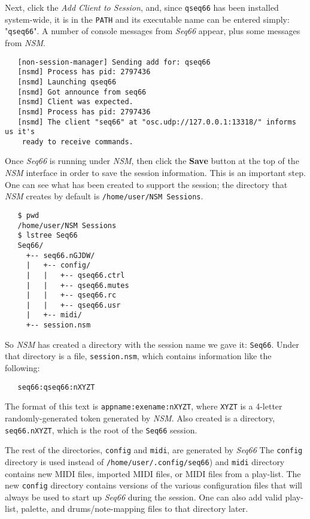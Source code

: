    Next, click the \textsl{Add Client to Session}, and, since
   \texttt{qseq66} has been installed system-wide, it is in the \texttt{PATH}
   and its executable name can be entered simply: "\texttt{qseq66}".
   A number of console messages from
   \textsl{Seq66} appear, plus some messages from \textsl{NSM}.

\begin{verbatim}
   [non-session-manager] Sending add for: qseq66
   [nsmd] Process has pid: 2797436
   [nsmd] Launching qseq66
   [nsmd] Got announce from seq66
   [nsmd] Client was expected.
   [nsmd] Process has pid: 2797436
   [nsmd] The client "seq66" at "osc.udp://127.0.0.1:13318/" informs us it's
    ready to receive commands.
\end{verbatim}

   Once \textsl{Seq66} is running under \textsl{NSM},
   then click the \textbf{Save}
   button at the top of the \textsl{NSM} interface in order
   to save the session information.  This is an important step.
   One can see what has been created to support the session;
   the directory that \textsl{NSM}
   creates by default is \texttt{/home/user/NSM Sessions}.

\begin{verbatim}
   $ pwd
   /home/user/NSM Sessions
   $ lstree Seq66
   Seq66/
     +-- seq66.nGJDW/
     |   +-- config/
     |   |   +-- qseq66.ctrl
     |   |   +-- qseq66.mutes
     |   |   +-- qseq66.rc
     |   |   +-- qseq66.usr
     |   +-- midi/
     +-- session.nsm
\end{verbatim}

   So \textsl{NSM} has created a directory with the session name we gave it:
   \texttt{Seq66}.  Under that directory is a file, \texttt{session.nsm}, which
   contains information like the following:

\begin{verbatim}
   seq66:qseq66:nXYZT
\end{verbatim}

   The format of this text is \texttt{appname:exename:nXYZT}, where
   \texttt{XYZT} is a 4-letter randomly-generated token
   generated by \textsl{NSM}.
   Also created is a directory, \texttt{seq66.nXYZT}, which is the root of the
   \texttt{Seq66} session.

   The rest of the directories,
   \texttt{config} and \texttt{midi},
   are generated by \textsl{Seq66}
   The \texttt{config} directory is used instead of
   \texttt{/home/user/.config/seq66}) and \texttt{midi} directory
   contains new MIDI files, imported MIDI files,
   or MIDI files from a play-list.
   The new \texttt{config} directory
   contains versions of the various configuration files that will always be
   used to start up \textsl{Seq66} during the session.
   One can also add valid play-list, palette, and drums/note-mapping files to
   that directory later.

